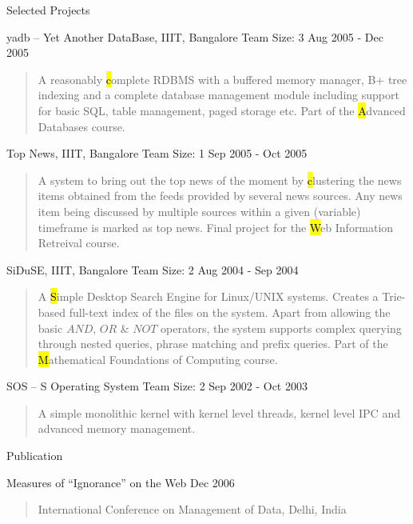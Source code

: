 \documentclass{resume}
\newcommand{\teamsize}{\hfill\sc\footnotesize Team Size: }
\begin{document}
\begin{category}{Selected Projects}{}
    \item {\topic yadb -- Yet Another DataBase,} IIIT, Bangalore
        {\teamsize 3}
        {\period Aug 2005 - Dec 2005}
        \begin{quote}
            A reasonably {\hl complete RDBMS} with a buffered memory manager,
            B+ tree indexing and a complete database management module
            including support for basic SQL, table management, paged storage
            etc. Part of the {\hl Advanced Databases} course.
        \end{quote}

    \item {\topic Top News,} IIIT, Bangalore
        {\teamsize 1}
        {\period Sep 2005 - Oct 2005}
        \begin{quote}
            A system to bring out the top news of the moment by {\hl clustering
            the news items} obtained from the feeds provided by several news
            sources. Any news item being discussed by multiple sources within a
            given (variable) timeframe is marked as top news. Final project
            for the {\hl Web Information Retreival} course.
        \end{quote}

    \item {\topic SiDuSE,} IIIT, Bangalore
        {\teamsize 2}
        {\period Aug 2004 - Sep 2004}
        \begin{quote}
            A {\hl Simple Desktop Search Engine} for Linux/UNIX systems.
            Creates a Trie-based full-text index of the files on the system.
            Apart from allowing the basic $AND$, $OR$ \& $NOT$ operators, the
            system supports complex querying through nested queries, phrase
            matching and prefix queries. Part of the {\hl Mathematical
            Foundations of Computing} course.
        \end{quote}

    \item {\topic SOS -- S Operating System}
        {\teamsize 2}
        {\period Sep 2002 - Oct 2003}
        \begin{quote}
            A simple monolithic kernel with kernel level threads, kernel level
            IPC and advanced memory management.
        \end{quote}

\end{category}


\begin{category}{Publication}{}

    \item {\topic Measures of ``Ignorance'' on the Web}
        {\period Dec 2006}
        \begin{quote}
            International Conference on Management of Data, Delhi, India
        \end{quote}

\end{category}
\end{document}
